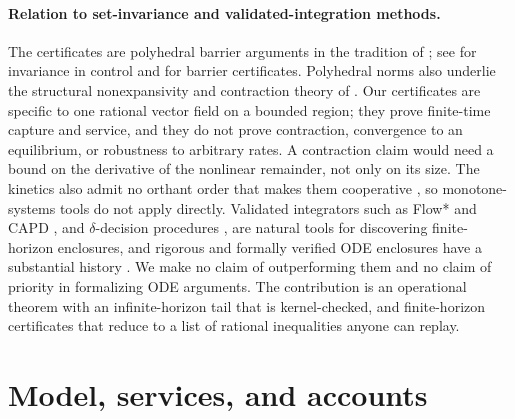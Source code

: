 \documentclass[11pt,a4paper]{article}
\theoremstyle{plain}
\theoremstyle{definition}
\theoremstyle{remark}
\begin{document}
\paragraph{Relation to set-invariance and validated-integration methods.}
The certificates are polyhedral barrier arguments in the tradition of
\citet{nagumo1942}; see \citet{blanchini1999} for invariance in control and
\citet{prajna2004} for barrier certificates. Polyhedral norms also underlie the
structural nonexpansivity and contraction theory of \citet{alradhawi2023}. Our
certificates are specific to one rational vector field on a bounded region;
they prove finite-time capture and service, and they do not prove contraction,
convergence to an equilibrium, or robustness to arbitrary rates. A contraction
claim would need a bound on the derivative of the nonlinear remainder, not only
on its size. The kinetics also admit no orthant order that makes them cooperative
\citep{companionNADPH}, so monotone-systems tools \citep{angeli2003} do not
apply directly. Validated integrators such as Flow*
\citep{chen2013} and CAPD \citep{kapela2021}, and $\delta$-decision procedures
\citep{gao2012}, are natural tools for discovering finite-horizon enclosures,
and rigorous and formally verified ODE enclosures have a substantial history
\citep{tucker2002,immler2018}. We make no claim of outperforming them and no
claim of priority in formalizing ODE arguments. The contribution is an
operational theorem with an infinite-horizon tail that is kernel-checked, and
finite-horizon certificates that reduce to a list of rational inequalities
anyone can replay.

\section{Model, services, and accounts}\label{sec:model}
\end{document}
